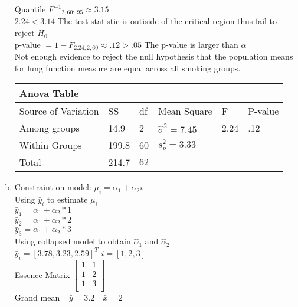 \documentclass{article}
\newcommand{\bx}{\bar{x}}
\newcommand{\by}{\bar{y}}
\begin{document}
\begin{flushleft}
\begin{enumerate}[(a)]
Quantile ${F^{-1}}_{2,60;.95} \approx 3.15$\\

$2.24<3.14$ The test statistic is outiside of the critical region thus fail to reject $H_0$\\

p-value $= 1-F_{2.24,2,60}\approx .12>.05$ The p-value is larger than $\alpha$\\

Not enough evidence to reject the null hypothesis that the population means for lung function measure are equal across all smoking groups.\\

\begin{tabular}{l l l l l l}
	\textbf{Anova Table}\\
	\hline
	Source of Variation & SS & df & Mean Square & F & P-value \\ \hline
	Among groups & 14.9 &  2 & $\hat{\sigma}^2=7.45$ & 2.24 & .12 \\
	Within Groups & 199.8& 60 & $s^2_p=3.33$ \\ \hline
	Total & 214.7 & $62$ \\ \hline
\end{tabular}

\pagebreak
\item

Constraint on model:  $\mu_i=\alpha_1+\alpha_2i$\\

Using $\bar{y}_i$ to estimate $\mu_i$\\

$\bar{y}_1=\alpha_1+\alpha_2*1$\\

$\bar{y}_2=\alpha_1+\alpha_2*2$\\

$\bar{y}_3=\alpha_1+\alpha_2*3$\\

Using collapsed model to obtain $\hat{\alpha}_1$ and $\hat{\alpha}_2$\\
$\bar{y}_i= [3.78,3.23,2.59]^T$  $i=[1,2,3]$\\
Essence Matrix  $\left[\begin{array}{rr}
1 & 1 \\ 
1 & 2 \\ 
1 & 3 \\ 
\end{array}
\right]$\\
Grand mean= $\by=3.2 \quad \bx=2$\\


\end{enumerate}
\end{flushleft}
\end{document}
